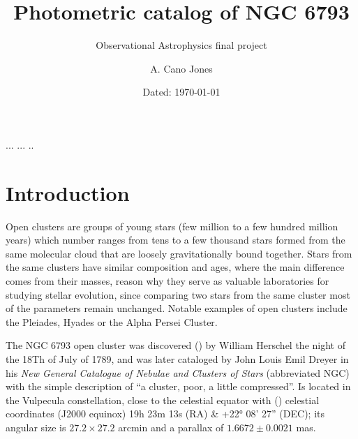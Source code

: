 \documentclass{aa}
\begin{document}
 


   \title{Photometric catalog of NGC 6793}

   \subtitle{Observational Astrophysics final project}

   \author{A. Cano Jones }


   \date{Dated: \today}
 
  \abstract
   {}
   {...}
   {...}
   {..}
   {}
   


   \maketitle
    \section{Introduction}\label{sec: Introduction}
    Open clusters are groups of young stars (few million to a few hundred million years) which number ranges from tens to a few thousand stars formed from the same molecular cloud that are loosely  gravitationally bound together. 
    Stars from the same clusters have similar composition and ages, where the main difference comes from their masses, reason why they serve as valuable laboratories for studying stellar evolution, since comparing two stars from the same cluster most of the parameters remain unchanged. Notable examples of open clusters include the Pleiades, Hyades or the Alpha Persei Cluster.

    The NGC 6793 open cluster was discovered (\cite{Seligman_2018}) by William Herschel the night of the 18Th of July of 1789, and was later cataloged by John Louis Emil Dreyer in his \textit{New General Catalogue of Nebulae and Clusters of Stars} (abbreviated NGC) with the simple description of ``a cluster, poor, a little compressed''. Is located in the Vulpecula constellation, close to the celestial equator with (\cite{SIMBAD}) celestial coordinates (J2000 equinox) 19h 23m 13s (RA) \& +22° 08’ 27” (DEC); its angular size is $27.2\times27.2$ arcmin and a parallax of $1.6672\pm 0.0021$ mas. 
\end{document}

